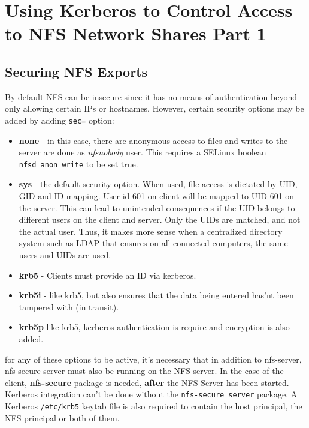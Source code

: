 \section{Using Kerberos to Control Access to NFS Network Shares Part 1}
\vspace{-10pt}
\subsection{Securing NFS Exports}
By default NFS can be insecure since it has no means of authentication beyond only allowing certain IPs or hostnames. However, certain security options may be added by adding \verb|sec=| option:

\begin{itemize}
	\item \textbf{none} - in this case, there are anonymous access to files and writes to the server are done as \textit{nfsnobody} user. This requires a SELinux boolean \verb|nfsd_anon_write| to be set true.
	
	\item \textbf{sys} - the default security option. When used, file access is dictated by UID, GID and ID mapping. User id 601 on client will be mapped to UID 601 on the server. This can lead to unintended consequences if the UID belongs to different users on the client and server. Only the UIDs are matched, and not the actual user. Thus, it makes more sense when a centralized directory system such as LDAP that ensures on all connected computers, the same users and UIDs are used. 
	
	\item \textbf{krb5} - Clients must provide an ID via kerberos. 
	
	\item \textbf{krb5i} - like krb5, but also ensures that the data being entered has'nt been tampered with (in transit). 
	
	\item \textbf{krb5p} like krb5, kerberos authentication is require and encryption is also added. 
\end{itemize}

\noindent for any of these options to be active, it's necessary that in addition to nfs-server, nfs-secure-server must also be running on the NFS server. In the case of the client, \textbf{nfs-secure} package is needed, \textbf{after} the NFS Server has been started. Kerberos integration can't be done without the \verb|nfs-secure server| package. A Kerberos \verb|/etc/krb5| keytab file is also required to contain the host principal, the NFS principal or both of them. 


